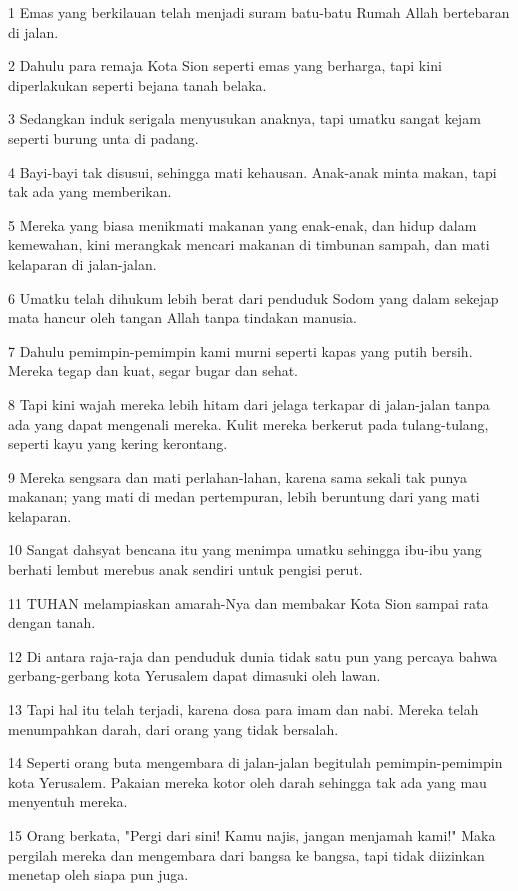\par 1 Emas yang berkilauan telah menjadi suram batu-batu Rumah Allah bertebaran di jalan.
\par 2 Dahulu para remaja Kota Sion seperti emas yang berharga, tapi kini diperlakukan seperti bejana tanah belaka.
\par 3 Sedangkan induk serigala menyusukan anaknya, tapi umatku sangat kejam seperti burung unta di padang.
\par 4 Bayi-bayi tak disusui, sehingga mati kehausan. Anak-anak minta makan, tapi tak ada yang memberikan.
\par 5 Mereka yang biasa menikmati makanan yang enak-enak, dan hidup dalam kemewahan, kini merangkak mencari makanan di timbunan sampah, dan mati kelaparan di jalan-jalan.
\par 6 Umatku telah dihukum lebih berat dari penduduk Sodom yang dalam sekejap mata hancur oleh tangan Allah tanpa tindakan manusia.
\par 7 Dahulu pemimpin-pemimpin kami murni seperti kapas yang putih bersih. Mereka tegap dan kuat, segar bugar dan sehat.
\par 8 Tapi kini wajah mereka lebih hitam dari jelaga terkapar di jalan-jalan tanpa ada yang dapat mengenali mereka. Kulit mereka berkerut pada tulang-tulang, seperti kayu yang kering kerontang.
\par 9 Mereka sengsara dan mati perlahan-lahan, karena sama sekali tak punya makanan; yang mati di medan pertempuran, lebih beruntung dari yang mati kelaparan.
\par 10 Sangat dahsyat bencana itu yang menimpa umatku sehingga ibu-ibu yang berhati lembut merebus anak sendiri untuk pengisi perut.
\par 11 TUHAN melampiaskan amarah-Nya dan membakar Kota Sion sampai rata dengan tanah.
\par 12 Di antara raja-raja dan penduduk dunia tidak satu pun yang percaya bahwa gerbang-gerbang kota Yerusalem dapat dimasuki oleh lawan.
\par 13 Tapi hal itu telah terjadi, karena dosa para imam dan nabi. Mereka telah menumpahkan darah, dari orang yang tidak bersalah.
\par 14 Seperti orang buta mengembara di jalan-jalan begitulah pemimpin-pemimpin kota Yerusalem. Pakaian mereka kotor oleh darah sehingga tak ada yang mau menyentuh mereka.
\par 15 Orang berkata, "Pergi dari sini! Kamu najis, jangan menjamah kami!" Maka pergilah mereka dan mengembara dari bangsa ke bangsa, tapi tidak diizinkan menetap oleh siapa pun juga.
